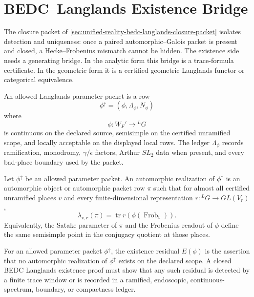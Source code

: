 \section{BEDC--Langlands Existence Bridge}
\label{sec:unified-reality-bedc-langlands-existence-bridge}

The closure packet of
\autoref{sec:unified-reality-bedc-langlands-closure-packet} isolates
detection and uniqueness: once a paired automorphic--Galois packet is
present and closed, a Hecke--Frobenius mismatch cannot be hidden. The
existence side needs a generating bridge. In the analytic form this
bridge is a trace-formula certificate. In the geometric form it is a
certified geometric Langlands functor or categorical equivalence.

\begin{definition}
\label{def:unified-reality-allowed-langlands-parameter-packet}
An allowed Langlands parameter packet is a row
$$
\phi^{\uparrow}
=
(\phi,\Lambda_{\phi},N_{\phi})
$$
where
$$
\phi:W_F'\longrightarrow{}^LG
$$
is continuous on the declared source, semisimple on the certified
unramified scope, and locally acceptable on the displayed local rows.
The ledger $\Lambda_{\phi}$ records ramification, monodromy,
$\gamma/\epsilon$ factors, Arthur $SL_2$ data when present, and every
bad-place boundary used by the packet.
\end{definition}

\begin{definition}
\label{def:unified-reality-langlands-automorphic-realization}
Let $\phi^{\uparrow}$ be an allowed parameter packet. An automorphic
realization of $\phi^{\uparrow}$ is an automorphic object or automorphic
packet row $\pi$ such that for almost all certified unramified places
$v$ and every finite-dimensional representation $r:{}^LG\to GL(V_r)$,
$$
\lambda_{v,r}(\pi)
=
\operatorname{tr}r(\phi(\operatorname{Frob}_v)).
$$
Equivalently, the Satake parameter of $\pi$ and the Frobenius readout of
$\phi$ define the same semisimple point in the conjugacy quotient at
those places.
\end{definition}

\begin{definition}
\label{def:unified-reality-langlands-existence-residual}
For an allowed parameter packet $\phi^{\uparrow}$, the existence
residual $E(\phi)$ is the assertion that no automorphic realization of
$\phi^{\uparrow}$ exists on the declared scope. A closed BEDC
Langlands existence proof must show that any such residual is detected
by a finite trace window or is recorded in a ramified, endoscopic,
continuous-spectrum, boundary, or compactness ledger.
\end{definition}

